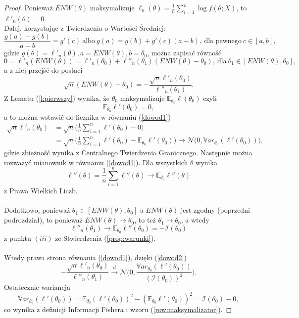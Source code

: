\begin{proof}
Ponieważ $ENW(\theta)$ maksymalizuje $\ell_n(\theta) = \frac{1}{n}\sum\limits_{i=1}^{n}\log f(\theta;X)$, to $\ell'_n(\theta)=0$. \\ Dalej, korzystając z Twierdzenia o Wartości Średniej:
$$\dfrac{g(a)-g(b)}{a-b} = g'(c) \ \text{albo} \ g(a)=g(b)+g'(c)(a-b), \ \text{dla pewnego} \ c \in [a,b],$$
gdzie $g(\theta) = \ell'_n(\theta), a = ENW(\theta), b = \theta_0$, można zapisać równość
$$ 0 = \ell'_n(ENW(\theta)) = \ell'_n(\theta_0) + \ell''_n(\theta_1)(ENW(\theta)-\theta_0), \ \text{dla} \ \theta_1 \in [ENW(\theta),\theta_0],$$ 
a z niej przejść do postaci 
\begin{equation}\label{dowod1}
\sqrt{n}(ENW(\theta)-\theta_0) = - \dfrac{\sqrt{n}\ell'_n(\theta_0)}{\ell''_n(\theta_1)}.
\end{equation}
Z Lematu (\ref{l:pierwszy}) wynika, że $\theta_0$ maksymalizuje $\mathbb{E}_{\theta_0}\ell(\theta_0)$ czyli
\begin{equation}\label{row:maksymalizator}
\mathbb{E}_{\theta_0}\ell'(\theta_0) = 0,
\end{equation}
a to można wstawić do licznika w równaniu (\ref{dowod1})
\begin{equation}\label{dowod2}
\begin{split}
\sqrt{n}\ell'_n(\theta_0) & = \sqrt{n}\Big(\frac{1}{n}\sum\limits_{i=1}^{n}\ell'(\theta_0) - 0\Big) \\
& = \sqrt{n}\Big(\frac{1}{n}\sum\limits_{i=1}^{n}\ell'(\theta_0) - \mathbb{E}_{\theta_0}\ell'(\theta_0)\Big) \rightarrow \mathcal{N}\Big(0, \mathbb{V}ar_{\theta_0}(\ell'(\theta_0))\Big),
\end{split}
\end{equation}
gdzie zbieżność wynika z Centralnego Twierdzenia Granicznego. 
\newpage
Następnie można rozważyć mianownik w równaniu (\ref{dowod1}). Dla wszystkich $\theta$ wynika
$$\ell''(\theta) = \frac{1}{n}\sum\limits_{i=1}^{n}\ell''(\theta) \rightarrow \mathbb{E}_{\theta_0}\ell''(\theta)$$
z Prawa Wielkich Liczb. \\ \ \\ Dodatkowo, ponieważ $\theta_1 \in [ENW(\theta),\theta_0]$ a $ENW(\theta)$ jest zgodny (poprzedni podrozdział), to ponieważ $ENW(\theta) \rightarrow \theta_0$, to też $\theta_1 \rightarrow \theta_0$, a wtedy
$$\ell''_n(\theta_1) \rightarrow \mathbb{E}_{\theta_0}\ell''(\theta_0) = -\mathcal{I}(\theta_0)$$
z punktu $(iii)$ ze Stwierdzenia (\ref{prop:warunki}).\\ \ \\ Wtedy prawa strona równania (\ref{dowod1}), dzięki (\ref{dowod2})
$$- \dfrac{\sqrt{n}\ell'_n(\theta_0)}{\ell''_n(\theta_1)} \overset{d}{\rightarrow} \mathcal{N}\Big(0,\dfrac{\mathbb{V}ar_{\theta_0}(\ell'(\theta_0))}{(\mathcal{I}(\theta_0))^2} \Big).$$
Ostatecznie wariancja
$$\mathbb{V}ar_{\theta_0}(\ell'(\theta_0)) = \mathbb{E}_{\theta_0}(\ell'(\theta_0))^2 - (\mathbb{E}_{\theta_0}\ell'(\theta_0))^2 = \mathcal{I}(\theta_0) - 0,$$
co wynika z definicji Informacji Fishera i wzoru (\ref{row:maksymalizator}).

\end{proof}